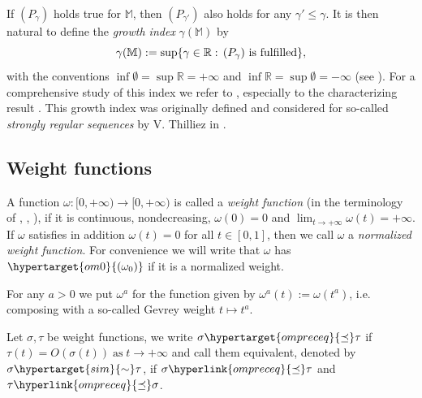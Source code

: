 \documentclass[11pt,a4paper]{article}
\theoremstyle{plain}
\theoremstyle{definition}
\newcommand{\RR}{\mathbb{R}}
\newcommand{\red}[1]{{\color{red}#1}}
\newcommand{\M}{\mathbb{M}}
\begin{document}
If $(P_\gamma)$ holds true for $\M$, then $(P_{\gamma'})$ also holds for any $\gamma'\leq\gamma$.
It is then natural to define the \textit{growth index} $\gamma(\M)$ by
$$\gamma(\M):=\sup\{\gamma\in\RR:\, (P_{\gamma})\hbox{ is fulfilled}\},$$%
with the conventions $\inf\emptyset=\sup\RR=+\infty$ and $\inf\RR=\sup\emptyset=-\infty$ (see \cite[Rem. 2.2]{index}). For a comprehensive study of this index we refer to \cite[Sect. 3]{index}, especially to the characterizing result \cite[Thm. 3.11]{index}.
This growth index was originally defined and considered for so-called {\itshape strongly regular sequences} by V. Thilliez in \cite[Sect. 1]{Thilliezdivision}.

\subsection{Weight functions}\label{ssect.WeightFunctions}
A function $\omega:[0,+\infty)\rightarrow[0,+\infty)$ is called a {\itshape weight function} (in the terminology of \cite[Sect. 2.1]{index}, \cite[Sect. 2.2]{sectorialextensions}, \cite[Sect. 2.2]{sectorialextensions1}), if it is continuous, nondecreasing, $\omega(0)=0$ and $\lim_{t\rightarrow+\infty}\omega(t)=+\infty$. If $\omega$ satisfies in addition $\omega(t)=0$ for all $t\in[0,1]$, then we call $\omega$ a {\itshape normalized weight function}. For convenience we will write that $\omega$ has $\hypertarget{om0}{(\omega_0)}$ if it is a normalized weight.\vspace{6pt}

For any $a>0$ we put $\omega^a$ for the function given by $\omega^a(t):=\omega(t^a)$, i.e. composing with a so-called Gevrey weight $t\mapsto t^a$.
\vspace{6pt}


Let $\sigma,\tau$ be weight functions, we write $\sigma\hypertarget{ompreceq}{\preceq}\tau$ if $\tau(t)=O(\sigma(t))\;\text{as}\;t\rightarrow+\infty$
and call them equivalent, denoted by $\sigma\hypertarget{sim}{\sim}\tau$, if
$\sigma\hyperlink{ompreceq}{\preceq}\tau$ and $\tau\hyperlink{ompreceq}{\preceq}\sigma$.\vspace{6pt}
\end{document}
